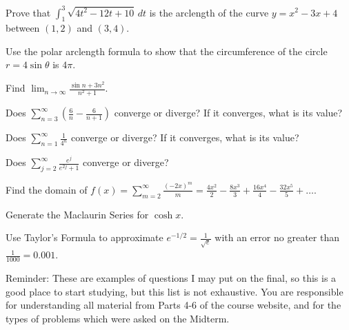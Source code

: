 \documentclass[12pt]{exam}
\newcommand{\<}{\langle}
\renewcommand{\>}{\rangle}
\begin{document}
\begin{center}
\end{center}
\vspace{0.1in}

\vspace{12pt}

\begin{questions}

\question
Prove that \(\int_1^3\sqrt{4t^2-12t+10}\,dt\) is the arclength of the curve
\(y=x^2-3x+4\) between \((1,2)\) and \((3,4)\).

\question
Use the polar arclength formula to show that the circumference of the
circle \(r=4\sin\theta\) is \(4\pi\).

\question
Find \(\displaystyle\lim_{n\to\infty}\frac{\sin n + 3n^2}{n^2+1}\).

\question
Does \(\displaystyle\sum_{n=3}^\infty\left(\frac{6}{n}-\frac{6}{n+1}\right)\)
converge or diverge? If it converges, what is its value?

\question
Does \(\displaystyle\sum_{n=1}^\infty\frac{1}{4^n}\) converge or
diverge? If it converges, what is its value?

\question
Does \(\displaystyle\sum_{j=2}^\infty\frac{e^j}{e^{2j}+1}\) converge or diverge?

\question
Find the domain of
\(\displaystyle f(x)=\sum_{m=2}^\infty\frac{(-2x)^m}{m}=
\frac{4x^2}{2}-\frac{8x^3}{3}+\frac{16x^4}{4}-\frac{32x^5}{5}+\dots\).

\question
Generate the Maclaurin Series for \(\cosh x\).

\question
Use Taylor's Formula to
approximate \(e^{-1/2}=\frac{1}{\sqrt e}\) with an error no greater than
\(\frac{1}{1000}=0.001\).

\end{questions}

\vspace{3em}

Reminder:
These are examples of questions I may put on the final, so this is a good
place to start studying, but this list
is not exhaustive. You are responsible for understanding
all material from Parts 4-6 of
the course website, and for the types of problems which were asked on the
Midterm.
\end{document}
